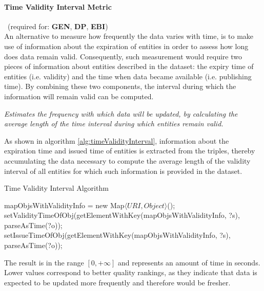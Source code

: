\paragraph{Time Validity Interval Metric}~(required for: \textbf{GEN}, \textbf{DP}, \textbf{EBI})~\\ %
An alternative to measure how frequently the data varies with time, is to make use of information about the expiration of entities in order to assess how long does data remain valid. Consequently, such measurement would require two pieces of information about entities described in the dataset: the expiry time of entities (i.e. validity) and the time when data became available (i.e. publishing time). By combining these two components, the interval during which the information will remain valid can be computed.
\begin{mdframed}[style=metricdefinition]
\emph{Estimates the frequency with which data will be updated, by calculating the average length of the time interval during which entities remain valid.}
\end{mdframed}

As shown in algorithm \ref{alg:timeValidityInterval}, information about the expiration time and issued time of entities is extracted from the triples, thereby accumulating the data necessary to compute the average length of the validity interval of all entities for which such information is provided in the dataset.
\begin{algorithm}
\caption{Time Validity Interval Algorithm} \label{alg:timeValidityInterval}
\begin{algorithmic}[1]
\State mapObjsWithValidityInfo = new Map$\langle URI, Object\rangle$();
\EndProcedure
{}
\State setValidityTimeOfObj(getElementWithKey(mapObjsWithValidityInfo, ?s), parseAsTime(?o));
\EndIf
{} 
\State setIssueTimeOfObj(getElementWithKey(mapObjsWithValidityInfo, ?s), parseAsTime(?o));
\EndIf ~\\
\EndProcedure
\end{algorithmic}
\end{algorithm}
The result is in the range $[0, +\infty]$ and represents an amount of time in seconds. Lower values correspond to better quality rankings, as they indicate that data is expected to be updated more frequently and therefore would be fresher.

